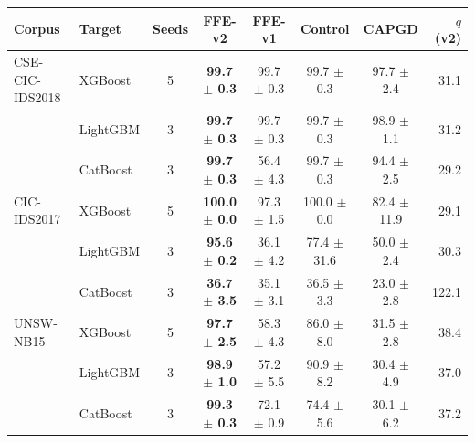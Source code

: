 \begin{tabular}{@{}llcccccr@{}}
\toprule
\textbf{Corpus} & \textbf{Target} & \textbf{Seeds} & \textbf{FFE-v2} & \textbf{FFE-v1} & \textbf{Control} & \textbf{CAPGD} & \textbf{$q$ (v2)} \\
\midrule
CSE-CIC-IDS2018 & XGBoost & 5 & \textbf{99.7 $\pm$ 0.3} & 99.7 $\pm$ 0.3 & 99.7 $\pm$ 0.3 & 97.7 $\pm$ 2.4 & 31.1 \\
 & LightGBM & 3 & \textbf{99.7 $\pm$ 0.3} & 99.7 $\pm$ 0.3 & 99.7 $\pm$ 0.3 & 98.9 $\pm$ 1.1 & 31.2 \\
 & CatBoost & 3 & \textbf{99.7 $\pm$ 0.3} & 56.4 $\pm$ 4.3 & 99.7 $\pm$ 0.3 & 94.4 $\pm$ 2.5 & 29.2 \\
\midrule
CIC-IDS2017 & XGBoost & 5 & \textbf{100.0 $\pm$ 0.0} & 97.3 $\pm$ 1.5 & 100.0 $\pm$ 0.0 & 82.4 $\pm$ 11.9 & 29.1 \\
 & LightGBM & 3 & \textbf{95.6 $\pm$ 0.2} & 36.1 $\pm$ 4.2 & 77.4 $\pm$ 31.6 & 50.0 $\pm$ 2.4 & 30.3 \\
 & CatBoost & 3 & \textbf{36.7 $\pm$ 3.5} & 35.1 $\pm$ 3.1 & 36.5 $\pm$ 3.3 & 23.0 $\pm$ 2.8 & 122.1 \\
\midrule
UNSW-NB15 & XGBoost & 5 & \textbf{97.7 $\pm$ 2.5} & 58.3 $\pm$ 4.3 & 86.0 $\pm$ 8.0 & 31.5 $\pm$ 2.8 & 38.4 \\
 & LightGBM & 3 & \textbf{98.9 $\pm$ 1.0} & 57.2 $\pm$ 5.5 & 90.9 $\pm$ 8.2 & 30.4 $\pm$ 4.9 & 37.0 \\
 & CatBoost & 3 & \textbf{99.3 $\pm$ 0.3} & 72.1 $\pm$ 0.9 & 74.4 $\pm$ 5.6 & 30.1 $\pm$ 6.2 & 37.2 \\
\bottomrule
\end{tabular}
